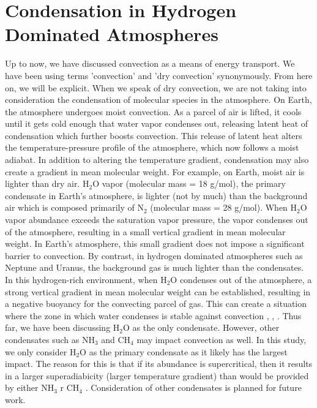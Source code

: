 \documentclass[11pt]{ucscthesisbs}
\begin{document}
\section{Condensation in Hydrogen Dominated Atmospheres}
Up to now, we have discussed convection as a means of energy transport. We have been using terms 'convection' and 'dry convection' synonymously.  From here on, we will be explicit. When we speak of dry convection, we are not taking into consideration the condensation of molecular species in the atmosphere. On Earth, the atmosphere undergoes moist convection. As a parcel of air is lifted, it cools until it gets cold enough that water vapor condenses out, releasing latent heat of condensation which further boosts convection. This release of latent heat alters the temperature-pressure profile of the atmosphere, which now follows a moist adiabat.  In addition to altering the temperature gradient, condensation may also create a gradient in mean molecular weight. For example, on Earth, moist air is lighter than dry air. H$_{2}$O vapor (molecular mass = 18 g/mol), the primary condensate in Earth's atmosphere, is lighter (not by much) than the background air which is composed primarily of N$_{2}$ (molecular mass = 28 g/mol). When H$_{2}$O vapor abundance exceeds the saturation vapor pressure, the vapor condenses out of the atmosphere, resulting in a small vertical gradient in mean molecular weight. In Earth's atmosphere, this small gradient does not impose a significant barrier to convection. By contrast, in hydrogen dominated atmospheres such as Neptune and Uranus, the background gas is much lighter than the condensates. In this hydrogen-rich environment, when H$_{2}$O condenses out of the atmosphere, a strong vertical gradient in mean molecular weight can be established, resulting in a negative buoyancy for the convecting parcel of gas. This can create a situation where the zone in which water condenses is stable against convection \citep{guillot_1995}, \citep{friedson_2017}, \citep{leconte_2017}. Thus far, we have been discussing H$_{2}$O as the only condensate. However, other condensates such as NH$_{3}$ and CH$_{4}$ may impact convection as well. In this study, we only consider H$_{2}$O as the primary condensate as it likely has the largest impact. The reason for this is that if its abundance is supercritical, then it results in a larger superadiabicity (larger temperature gradient) than would be provided by either NH$_{3}$ r CH$_{4}$ \citep{guillot_1995}. Consideration of other condensates is planned for future work.
\end{document}
